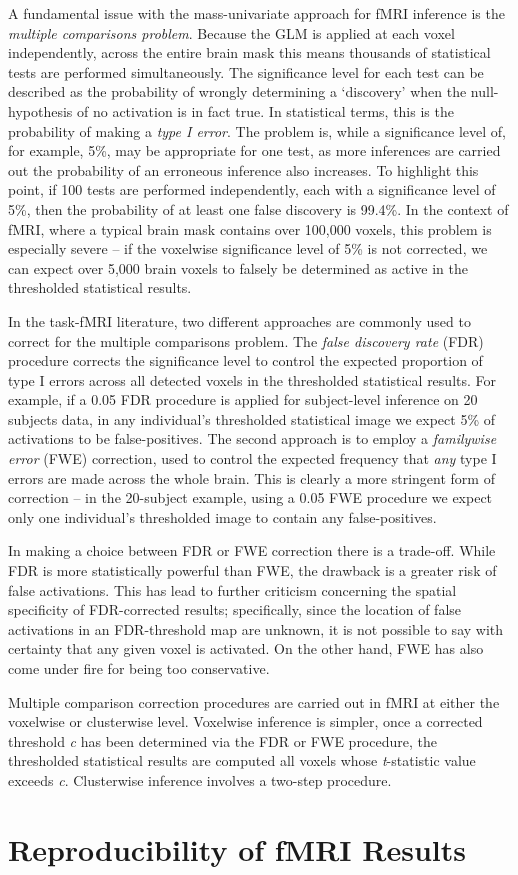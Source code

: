 A fundamental issue with the mass-univariate approach for fMRI inference is the \textit{multiple comparisons problem}. Because the GLM is applied at each voxel independently, across the entire brain mask this means thousands of statistical tests are performed simultaneously. The significance level for each test can be described as the probability of wrongly determining a `discovery' when the null-hypothesis of no activation is in fact true. In statistical terms, this is the probability of making a \textit{type I error}. The problem is, while a significance level of, for example, 5\%, may be appropriate for one test, as more inferences are carried out the probability of an erroneous inference also increases. To highlight this point, if 100 tests are performed independently, each with a significance level of 5\%, then the probability of at least one false discovery is 99.4\%. In the context of fMRI, where a typical brain mask contains over 100,000 voxels, this problem is especially severe -- if the voxelwise significance level of 5\% is not corrected, we can expect over 5,000 brain voxels to falsely be determined as active in the thresholded statistical results.

In the task-fMRI literature, two different approaches are commonly used to correct for the multiple comparisons problem. The \textit{false discovery rate} (FDR) procedure corrects the significance level to control the expected proportion of type I errors across all detected voxels in the thresholded statistical results. For example, if a 0.05 FDR procedure is applied for subject-level inference on 20 subjects data, in any individual's thresholded statistical image we expect 5\% of activations to be false-positives. The second approach is to employ a \textit{familywise error} (FWE) correction, used to control the expected frequency that \textit{any} type I errors are made across the whole brain. This is clearly a more stringent form of correction -- in the 20-subject example, using a 0.05 FWE procedure we expect only one individual's thresholded image to contain any false-positives. 

In making a choice between FDR or FWE correction there is a trade-off. While FDR is more statistically powerful than FWE, the drawback is a greater risk of false activations. This has lead to further criticism concerning the spatial specificity of FDR-corrected results; specifically, since the location of false activations in an FDR-threshold map are unknown, it is not possible to say with certainty that any given voxel is activated. On the other hand, FWE has also come under fire for being too conservative.

Multiple comparison correction procedures are carried out in fMRI at either the voxelwise or clusterwise level. Voxelwise inference is simpler, once a corrected threshold \textit{c} has been determined via the FDR or FWE procedure, the thresholded statistical results are computed all voxels whose \textit{t}-statistic value exceeds \textit{c}. Clusterwise inference involves a two-step procedure. 


\section{Reproducibility of fMRI Results}

